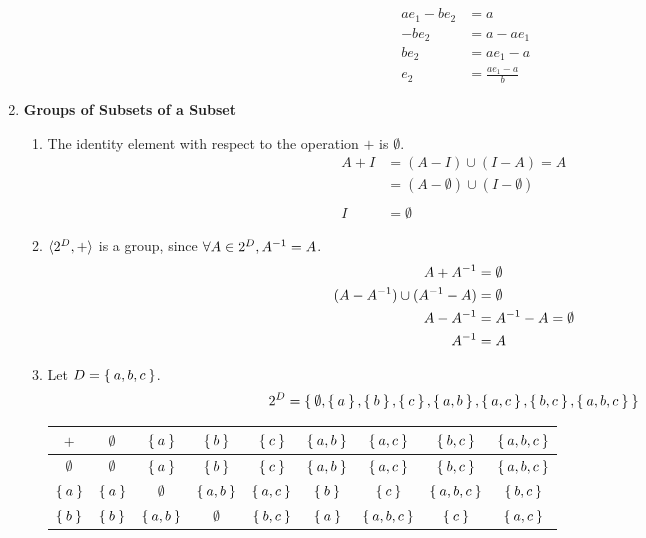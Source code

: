 \begin{enumerate}[label={\Alph*.},font={\bfseries}]
\begin{enumerate}[label={\arabic*},font={\bfseries}]
\begin{enumerate}[label={(\roman*)}]
\begin{align*}
        \\
        ae_1-be_2 &= a \\
        -be_2 &= a-ae_1 \\
        be_2 &= ae_1-a \\
        e_2 &= \frac{ae_1-a}{b}
      \end{align*}
    \end{enumerate}
  \end{enumerate}
  \newpage
\item {\bf Groups of Subsets of a Subset}
  \begin{enumerate}[label={\arabic*},font={\bfseries}]
  \item The identity element with respect to the operation $+$ is $\emptyset$.
    \begin{align*}
      A+I &= (A-I) \cup (I-A) = A \\
      &= (A-\emptyset) \cup (I-\emptyset) \\
      \\
      I &= \emptyset
    \end{align*}
  \item $\langle2^{D}, +\rangle$ is a group, since
    $\forall A \in 2^{D}, A^{-1} = A$.
    \begin{align*}
      A+A^{-1} &= \emptyset \\
      (A-A^{-1}) \cup (A^{-1}-A) &= \emptyset \\
      A-A^{-1} &= A^{-1}-A = \emptyset \\
      A^{-1} &= A
    \end{align*}
  \item Let $D = \Set{a,b,c}$.
    \[
    2^{D} = \Set{
      \emptyset,
      \Set{a}, \Set{b}, \Set{c},
      \Set{a,b}, \Set{a,c}, \Set{b,c},
      \Set{a,b,c}
    }
    \]
    \begin{center}
      \begin{tabular}{ c | c c c c c c c c}
        $+$ & $\emptyset$ & $\Set{a}$ & $\Set{b}$ & $\Set{c}$ & $\Set{a,b}$ & $\Set{a,c}$ & $\Set{b,c}$ & $\Set{a,b,c}$ \\
        \hline
        $\emptyset$ & $\emptyset$ & $\Set{a}$ & $\Set{b}$ & $\Set{c}$ & $\Set{a,b}$ & $\Set{a,c}$ & $\Set{b,c}$ & $\Set{a,b,c}$ \\
        $\Set{a}$ & $\Set{a}$ & $\emptyset$ & $\Set{a,b}$ & $\Set{a,c}$ & $\Set{b}$ & $\Set{c}$ & $\Set{a,b,c}$ & $\Set{b,c}$ \\
        $\Set{b}$ & $\Set{b}$ & $\Set{a,b}$ & $\emptyset$ & $\Set{b,c}$ & $\Set{a}$ & $\Set{a,b,c}$ & $\Set{c}$ & $\Set{a,c}$ \\

\end{tabular}
\end{center}
\end{enumerate}
\end{enumerate}
